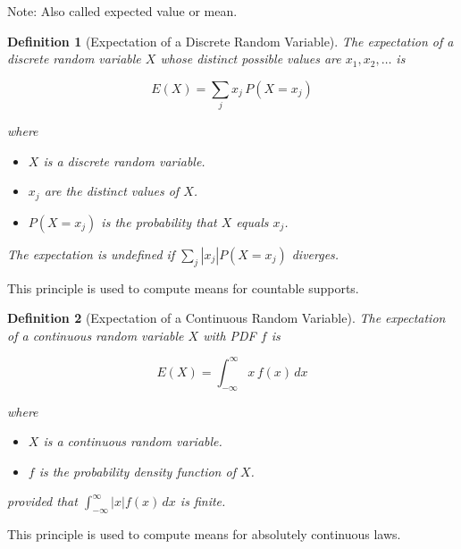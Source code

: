 \documentclass{article}
\newtheorem{definition}{Definition}
\begin{document}
Note: Also called expected value or mean.

\begin{mdframed}
\begin{definition}[Expectation of a Discrete Random Variable]
The expectation of a discrete random variable $X$ whose distinct possible values are $x_1,x_2,\ldots$ is

$$
E(X) = \sum_{j} x_j\,P(X=x_j)
$$

where

\begin{itemize}
    \item $X$ is a discrete random variable.
    \item $x_j$ are the distinct values of $X$.
    \item $P(X=x_j)$ is the probability that $X$ equals $x_j$.
\end{itemize}

The expectation is undefined if $\sum_j |x_j|P(X=x_j)$ diverges.
\end{definition}
\end{mdframed}

This principle is used to compute means for countable supports.

\begin{mdframed}
\begin{definition}[Expectation of a Continuous Random Variable]
The expectation of a continuous random variable $X$ with PDF $f$ is

$$
E(X) = \int_{-\infty}^{\infty} x\,f(x)\,dx
$$

where

\begin{itemize}
    \item $X$ is a continuous random variable.
    \item $f$ is the probability density function of $X$.
\end{itemize}

provided that $\int_{-\infty}^{\infty}|x|f(x)\,dx$ is finite.
\end{definition}
\end{mdframed}

This principle is used to compute means for absolutely continuous laws.
\end{document}
